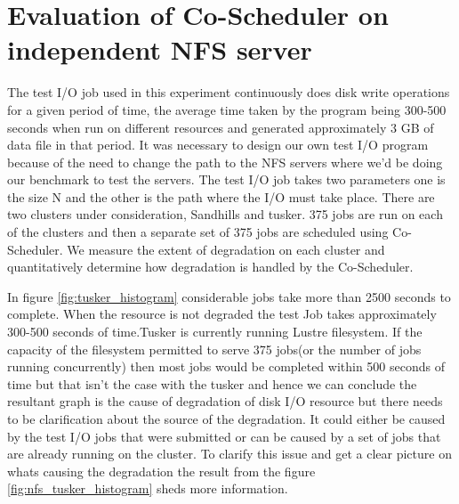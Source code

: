 \documentclass[ms,electronic,double]{nuthesis}
\begin{document}
\section{Evaluation of Co-Scheduler on independent NFS server}

The test I/O job used in this experiment continuously does disk write operations for a given period of time, the average
time taken by the program being 300-500 seconds when run on different resources and generated approximately 3 GB of data file
in that period. It was necessary to design our own test I/O program because of the need to change the path
to the NFS servers where we'd be doing our benchmark to test the servers. The test I/O job takes two parameters
one is the size N and the other is the path where the I/O must take place. There are two 
clusters under consideration, Sandhills and tusker. 375 jobs are run on each of 
the clusters and then a separate set of 375 jobs are scheduled using 
Co-Scheduler. We measure the extent of degradation on each cluster and quantitatively 
determine how degradation is handled by the Co-Scheduler.

In figure \ref{fig:tusker_histogram}  considerable jobs take more than 2500 seconds to complete. 
When the resource is not degraded the test Job takes approximately 300-500 seconds of time.Tusker is 
currently running Lustre filesystem. If the capacity of the filesystem permitted 
to serve 375 jobs(or the number of jobs running concurrently) then most jobs 
would be completed within 500 seconds of time but that isn't the case with the 
tusker and hence we can conclude the resultant graph is the cause of degradation 
of disk I/O resource but there needs to be clarification about the source of the degradation. 
It could either be caused by the test I/O jobs that were submitted or can be caused 
by a set of jobs that are already running on the cluster. To clarify this issue 
and get a clear picture on whats causing the degradation the result from the 
figure \ref{fig:nfs_tusker_histogram} sheds more information.
\end{document}
